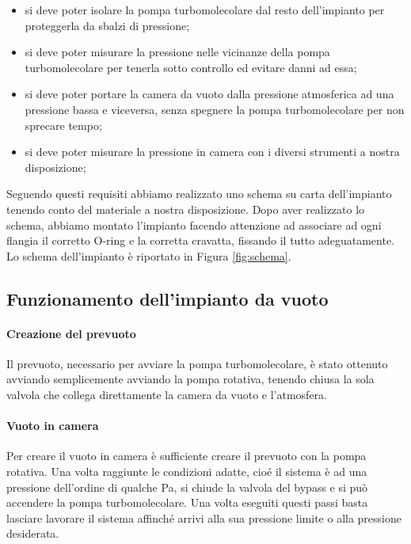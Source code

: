 \begin{itemize}
	\item{si deve poter isolare la pompa turbomolecolare dal resto dell'impianto per proteggerla da sbalzi di pressione;}
	\item{si deve poter misurare la pressione nelle vicinanze della pompa turbomolecolare per tenerla sotto controllo ed evitare danni ad essa;}	
	\item{si deve poter portare la camera da vuoto dalla pressione atmosferica ad una pressione bassa e viceversa, senza spegnere la pompa turbomolecolare per non sprecare tempo;}
	\item{si deve poter misurare la pressione in camera con i diversi strumenti a nostra disposizione;}
\end{itemize}

Seguendo questi requisiti abbiamo realizzato uno schema su carta dell'impianto tenendo conto del materiale a nostra disposizione. Dopo aver realizzato lo schema, abbiamo montato l'impianto facendo attenzione ad associare ad ogni flangia il corretto O-ring e la corretta cravatta, fissando il tutto adeguatamente. Lo schema dell'impianto è riportato in Figura \ref{fig:schema}.

\subsection{Funzionamento dell'impianto da vuoto}
\paragraph{Creazione del prevuoto\\}
Il prevuoto, necessario per avviare la pompa turbomolecolare, è stato ottenuto avviando semplicemente avviando la pompa rotativa, tenendo chiusa la sola valvola che collega direttamente la camera da vuoto e l'atmosfera.
\paragraph{Vuoto in camera\\}
Per creare il vuoto in camera è sufficiente creare il prevuoto con la pompa rotativa. Una volta raggiunte le condizioni adatte, cioé il sistema è ad una pressione dell'ordine di qualche \si{\Pa}, si chiude la valvola del bypass e si può accendere la pompa turbomolecolare. Una volta eseguiti questi passi basta lasciare lavorare il sistema affinché arrivi alla sua pressione limite o alla pressione desiderata. %
